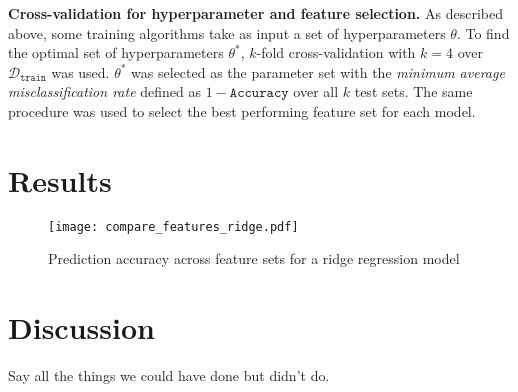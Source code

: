 \documentclass[10pt,conference,compsocconf]{IEEEtran}
\newcommand{\parabf}[1]{\vspace{1mm}\noindent\textbf{#1}}
\newcommand{\Dtrain}{\mathcal{D}_{\mathtt{train}}}
\begin{document}
\parabf{Cross-validation for hyperparameter and feature selection.} As described above, some training algorithms take as input a set of hyperparameters $\theta$. To find the optimal set of hyperparameters $\theta^*$, $k$-fold cross-validation with $k=4$ over $\Dtrain$ was used. $\theta^*$ was selected as the parameter set with the \emph{minimum average misclassification rate} defined as $1 - \mathtt{Accuracy}$ over all $k$ test sets. The same procedure was used to select the best performing feature set for each model.\\
\section{Results}
\label{sec:results}

\begin{figure}
	\texttt{[image: compare\_features\_ridge.pdf]}
	\caption{Prediction accuracy across feature sets for a ridge regression model}
	\vspace*{-5mm}
	\setlength{\belowcaptionskip}{-10pt}
\end{figure}

\section{Discussion}
Say all the things we could have done but didn't do.



\end{document}
